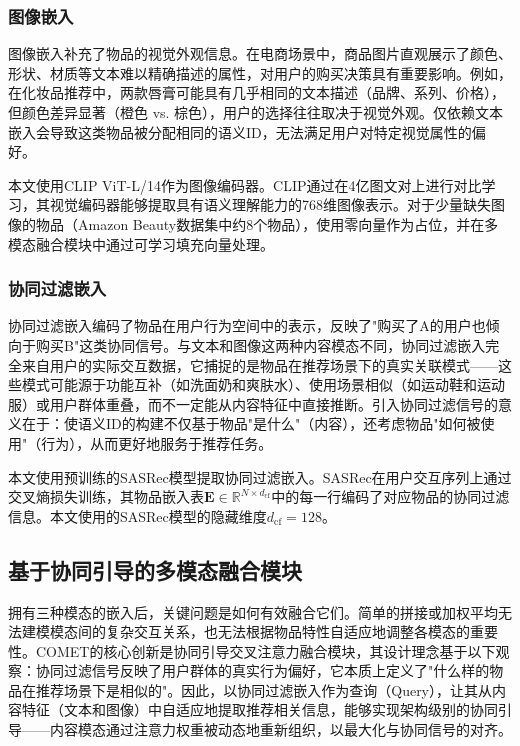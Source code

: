\subsubsection{图像嵌入}

图像嵌入补充了物品的视觉外观信息。在电商场景中，商品图片直观展示了颜色、形状、材质等文本难以精确描述的属性，对用户的购买决策具有重要影响。例如，在化妆品推荐中，两款唇膏可能具有几乎相同的文本描述（品牌、系列、价格），但颜色差异显著（橙色 vs. 棕色），用户的选择往往取决于视觉外观。仅依赖文本嵌入会导致这类物品被分配相同的语义ID，无法满足用户对特定视觉属性的偏好。

本文使用CLIP ViT-L/14\cite{radford2021learning}作为图像编码器。CLIP通过在4亿图文对上进行对比学习，其视觉编码器能够提取具有语义理解能力的768维图像表示。对于少量缺失图像的物品（Amazon Beauty数据集中约8个物品），使用零向量作为占位，并在多模态融合模块中通过可学习填充向量处理。

\subsubsection{协同过滤嵌入}

协同过滤嵌入编码了物品在用户行为空间中的表示，反映了"购买了A的用户也倾向于购买B"这类协同信号。与文本和图像这两种内容模态不同，协同过滤嵌入完全来自用户的实际交互数据，它捕捉的是物品在推荐场景下的真实关联模式——这些模式可能源于功能互补（如洗面奶和爽肤水）、使用场景相似（如运动鞋和运动服）或用户群体重叠，而不一定能从内容特征中直接推断。引入协同过滤信号的意义在于：使语义ID的构建不仅基于物品"是什么"（内容），还考虑物品"如何被使用"（行为），从而更好地服务于推荐任务。

本文使用预训练的SASRec\cite{kang2018self}模型提取协同过滤嵌入。SASRec在用户交互序列上通过交叉熵损失训练，其物品嵌入表$\mathbf{E} \in \mathbb{R}^{N \times d_{\text{cf}}}$中的每一行编码了对应物品的协同过滤信息。本文使用的SASRec模型的隐藏维度$d_{\text{cf}}=128$。

\subsection{基于协同引导的多模态融合模块}

拥有三种模态的嵌入后，关键问题是如何有效融合它们。简单的拼接或加权平均无法建模模态间的复杂交互关系，也无法根据物品特性自适应地调整各模态的重要性。COMET的核心创新是协同引导交叉注意力融合模块，其设计理念基于以下观察：协同过滤信号反映了用户群体的真实行为偏好，它本质上定义了"什么样的物品在推荐场景下是相似的"。因此，以协同过滤嵌入作为查询（Query），让其从内容特征（文本和图像）中自适应地提取推荐相关信息，能够实现架构级别的协同引导——内容模态通过注意力权重被动态地重新组织，以最大化与协同信号的对齐。

